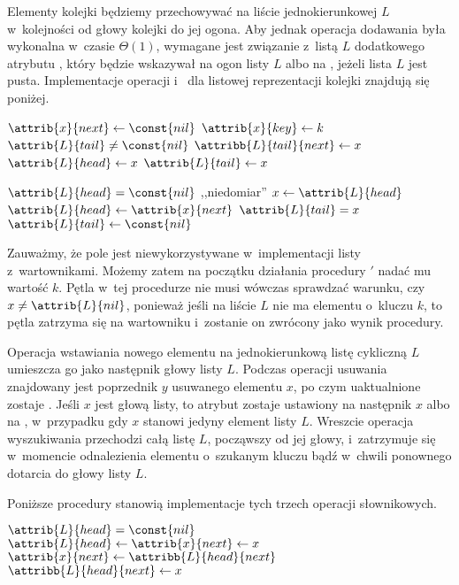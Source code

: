 \exercise %
Elementy kolejki będziemy przechowywać na liście jednokierunkowej $L$ w~kolejności od głowy kolejki do jej ogona.
Aby jednak operacja dodawania była wykonalna w~czasie $\Theta(1)$, wymagane jest związanie z~listą $L$ dodatkowego atrybutu , który będzie wskazywał na ogon listy $L$ albo na , jeżeli lista $L$ jest pusta.
Implementacje operacji  i~ dla listowej reprezentacji kolejki znajdują się poniżej.
\begin{codebox}
\li	$\attrib{x}{next}\gets\const{nil}$
\li	$\attrib{x}{key}\gets k$
\li	\If $\attrib{L}{tail}\ne\const{nil}$
\li		\Then $\attribb{L}{tail}{next}\gets x$
\li		\Else $\attrib{L}{head}\gets x$
		\End
\li	$\attrib{L}{tail}\gets x$
\end{codebox}

\begin{codebox}
\li	\If $\attrib{L}{head}=\const{nil}$
\li		\Then \Error ,,niedomiar''
		\End
\li	$x\gets\attrib{L}{head}$
\li	$\attrib{L}{head}\gets\attrib{x}{next}$
\li	\If $\attrib{L}{tail}=x$
\li		\Then $\attrib{L}{tail}\gets\const{nil}$
		\End
\li	\Return {}
\end{codebox}

\exercise %
Zauważmy, że pole  jest niewykorzystywane w~implementacji listy z~wartownikami.
Możemy zatem na początku działania procedury $'$ nadać mu wartość $k$.
Pętla  w~tej procedurze nie musi wówczas sprawdzać warunku, czy $x\ne\attrib{L}{nil}$, ponieważ jeśli na liście $L$ nie ma elementu o~kluczu $k$, to pętla zatrzyma się na wartowniku  i~zostanie on zwrócony jako wynik procedury.

\exercise %
Operacja wstawiania nowego elementu na jednokierunkową listę cykliczną $L$ umieszcza go jako następnik głowy listy $L$.
Podczas operacji usuwania znajdowany jest poprzednik $y$ usuwanego elementu $x$, po czym uaktualnione zostaje .
Jeśli $x$ jest głową listy, to atrybut  zostaje ustawiony na następnik $x$ albo na , w~przypadku gdy $x$ stanowi jedyny element listy $L$.
Wreszcie operacja wyszukiwania przechodzi całą listę $L$, począwszy od jej głowy, i~zatrzymuje się w~momencie odnalezienia elementu o~szukanym kluczu bądź w~chwili ponownego dotarcia do głowy listy $L$.

Poniższe procedury stanowią implementacje tych trzech operacji słownikowych.
\begin{codebox}
\li	\If $\attrib{L}{head}=\const{nil}$
\li		\Then $\attrib{L}{head}\gets\attrib{x}{next}\gets x$
\li		\Else $\attrib{x}{next}\gets\attribb{L}{head}{next}$
\li			$\attribb{L}{head}{next}\gets x$
		\End
\end{codebox}

